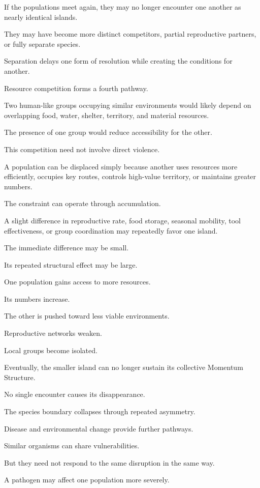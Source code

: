If the populations meet again, they may no longer encounter one another as nearly identical islands.

They may have become more distinct competitors, partial reproductive partners, or fully separate species.

Separation delays one form of resolution while creating the conditions for another.

Resource competition forms a fourth pathway.

Two human-like groups occupying similar environments would likely depend on overlapping food, water, shelter, territory, and material resources.

The presence of one group would reduce accessibility for the other.

This competition need not involve direct violence.

A population can be displaced simply because another uses resources more efficiently, occupies key routes, controls high-value territory, or maintains greater numbers.

The constraint can operate through accumulation.

A slight difference in reproductive rate, food storage, seasonal mobility, tool effectiveness, or group coordination may repeatedly favor one island.

The immediate difference may be small.

Its repeated structural effect may be large.

One population gains access to more resources.

Its numbers increase.

The other is pushed toward less viable environments.

Reproductive networks weaken.

Local groups become isolated.

Eventually, the smaller island can no longer sustain its collective Momentum Structure.

No single encounter causes its disappearance.

The species boundary collapses through repeated asymmetry.

Disease and environmental change provide further pathways.

Similar organisms can share vulnerabilities.

But they need not respond to the same disruption in the same way.

A pathogen may affect one population more severely.

